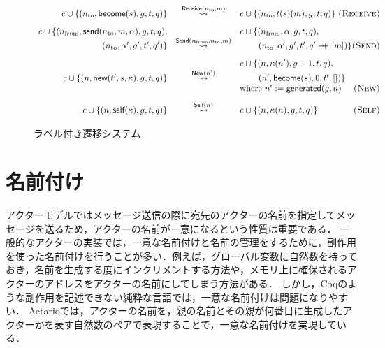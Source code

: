 \begin{figure}[t]\centering
  \begin{displaymath}
    \begin{array}{rcl}
      c \cup \{(n_{\textrm{to}}, \textsf{become}(s), g, t, q)\} &
      \overset{\textsf{Receive}(n_{\textrm{to}}, m)}{\leadsto} &
      c \cup \{(n_{\textrm{to}}, t(s)(m), g, t, q)\}
      \hfill \textsc{(Receive)} \\[2ex]

      c \cup \{(n_{\textrm{from}}, \textsf{send}(n_{\textrm{to}}, m, \alpha), g, t, q),
      & &
      c \cup \{(n_{\textrm{from}}, \alpha, g, t, q), \\
      (n_{\textrm{to}}, \alpha', g', t', q')\} &
      \overset{\textsf{Send}(n_{\textrm{from}}, n_{\textrm{to}}, m)}{\leadsto} &
      \hspace{5ex} (n_{\textrm{to}}, \alpha', g', t', q' \doubleplus [m])\}
      \hfill \textsc{(Send)} \\[2ex]

      & & c \cup \{(n, \kappa(n'), g + 1, t, q), \\
      c \cup \{(n, \textsf{new}(t', s, \kappa), g, t, q)\} &
      \overset{\textsf{New}(n')}{\leadsto} &
      \hspace{5ex} (n', \textsf{become}(s), 0, t', [])\} \\
      & & \textrm{where}\ n' := \textsf{generated}(g, n)
      \hfill \textsc{(New)} \\[2ex]

      c \cup \{(n, \textsf{self}(\kappa), g, t, q)\} &
      \overset{\textsf{Self}(n)}{\leadsto} &
      c \cup \{(n, \kappa(n), g, t, q)\}
      \hfill \textsc{(Self)}
    \end{array}
  \end{displaymath}
  \caption{ラベル付き遷移システム}\label{expr:formalization:semantics}
\end{figure}

\section{名前付け}

アクターモデルではメッセージ送信の際に宛先のアクターの名前を指定してメッセージを送るため，アクターの名前が一意になるという性質は重要である．
一般的なアクターの実装では，一意な名前付けと名前の管理をするために，副作用を使った名前付けを行うことが多い．例えば，グローバル変数に自然数を持っておき，名前を生成する度にインクリメントする方法や，メモリ上に確保されるアクターのアドレスをアクターの名前にしてしまう方法がある．
しかし，Coqのような副作用を記述できない純粋な言語では，一意な名前付けは問題になりやすい．
Actarioでは，アクターの名前を，親の名前とその親が何番目に生成したアクターかを表す自然数のペアで表現することで，一意な名前付けを実現している．

